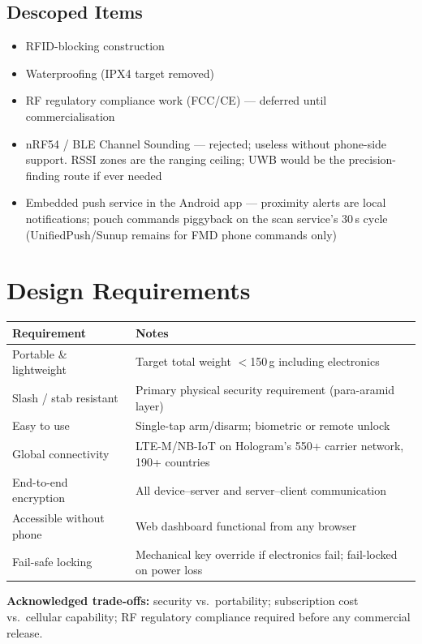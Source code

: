 \documentclass[11pt,a4paper]{article}
\begin{document}
\subsection{Descoped Items}

\begin{itemize}
  \item RFID-blocking construction
  \item Waterproofing (IPX4 target removed)
  \item RF regulatory compliance work (FCC/CE) --- deferred until commercialisation
  \item nRF54 / BLE Channel Sounding --- rejected; useless without phone-side support. RSSI zones are the ranging ceiling; UWB would be the precision-finding route if ever needed
  \item Embedded push service in the Android app --- proximity alerts are local notifications; pouch commands piggyback on the scan service's 30\,s cycle (UnifiedPush/Sunup remains for FMD phone commands only)
\end{itemize}

\section{Design Requirements}

\begin{table}[h]
\small
\begin{tabularx}{\textwidth}{lL}
\toprule
\textbf{Requirement} & \textbf{Notes}\\
\midrule
Portable \& lightweight & Target total weight $<$150\,g including electronics\\
Slash / stab resistant & Primary physical security requirement (para-aramid layer)\\
Easy to use & Single-tap arm/disarm; biometric or remote unlock\\
Global connectivity & LTE-M/NB-IoT on Hologram's 550+ carrier network, 190+ countries\\
End-to-end encryption & All device--server and server--client communication\\
Accessible without phone & Web dashboard functional from any browser\\
Fail-safe locking & Mechanical key override if electronics fail; fail-locked on power loss\\
\bottomrule
\end{tabularx}
\end{table}

\textbf{Acknowledged trade-offs:} security vs.\ portability; subscription cost vs.\ cellular capability; RF regulatory compliance required before any commercial release.
\end{document}

